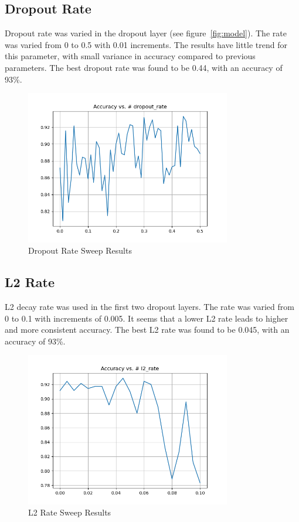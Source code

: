 \documentclass{article}
\begin{document}
\subsection{Dropout Rate}

Dropout rate was varied in the dropout layer (see figure~\ref{fig:model}). The rate was varied from 0 to 0.5 with 0.01 increments. The results have little trend for this parameter, with small variance in accuracy compared to previous parameters. The best dropout rate was found to be 0.44, with an accuracy of 93\%.

\begin{figure}[H]
    \centering
    \includegraphics[width=0.8\textwidth]{../media/dropout_rate_sweep.png}
    \caption{Dropout Rate Sweep Results}
    \label{fig:dropout}
\end{figure}

\subsection{L2 Rate}

L2 decay rate was used in the first two dropout layers. The rate was varied from 0 to 0.1 with increments of 0.005. It seems that a lower L2 rate leads to higher and more consistent accuracy. The best L2 rate was found to be 0.045, with an accuracy of 93\%.

\begin{figure}[H]
    \centering
    \includegraphics[width=0.8\textwidth]{../media/l2_rate_sweep.png}
    \caption{L2 Rate Sweep Results}
    \label{fig:l2}
\end{figure}
\end{document}
